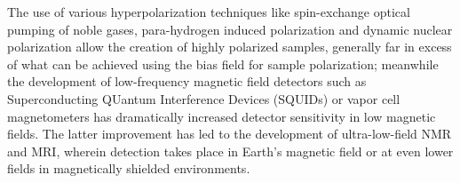 \documentclass[PaulGanssle-Thesis.tex]{subfiles}
\begin{document}
The use of various hyperpolarization techniques like spin-exchange optical pumping of noble gases,\cite{Walker1997,Goodson2002,Schroder2008} para-hydrogen induced polarization\cite{Theis2011,Lloyd2012} and dynamic nuclear polarization\cite{Maly2008,bentum-2011} allow the creation of highly polarized samples, generally far in excess of what can be achieved using the bias field for sample polarization; meanwhile the development of low-frequency magnetic field detectors such as Superconducting QUantum Interference Devices (SQUIDs)\cite{Webb1977,Meredith1973} or vapor cell magnetometers has dramatically increased detector sensitivity in low magnetic fields. The latter improvement has led to the development of ultra-low-field NMR and MRI, wherein detection takes place in Earth's magnetic field\cite{appelt-natphys-2006} or at even lower fields in magnetically shielded environments.\cite{Mossle2006,Ledbetter2011,Schwindt2004,Seltzer2004,Ledbetter2008}
\end{document}
